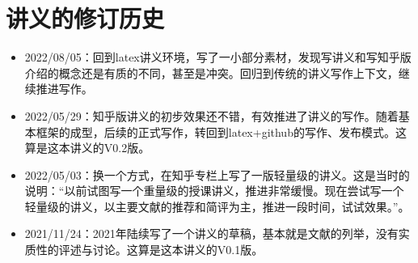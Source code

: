 \documentclass[UTF8]{ctexrep}
\begin{document}
\chapter{讲义的修订历史}

\renewcommand{\labelitemi}{\Writinghand}
%
\begin{itemize}
    \item 2022/08/05：回到latex讲义环境，写了一小部分素材，发现写讲义和写知乎版介绍的概念还是有质的不同，甚至是冲突。回归到传统的讲义写作上下文，继续推进写作。

    \item 2022/05/29：知乎版讲义的初步效果还不错，有效推进了讲义的写作。随着基本框架的成型，后续的正式写作，转回到latex+github的写作、发布模式。这算是这本讲义的V0.2版。
    
    \item 2022/05/03：换一个方式，在知乎专栏上写了一版轻量级的讲义。这是当时的说明：“以前试图写一个重量级的授课讲义，推进非常缓慢。现在尝试写一个轻量级的讲义，以主要文献的推荐和简评为主，推进一段时间，试试效果。”。
    
    \item 2021/11/24：2021年陆续写了一个讲义的草稿，基本就是文献的列举，没有实质性的评述与讨论。这算是这本讲义的V0.1版。
\end{itemize}


%
%




\end{document}
